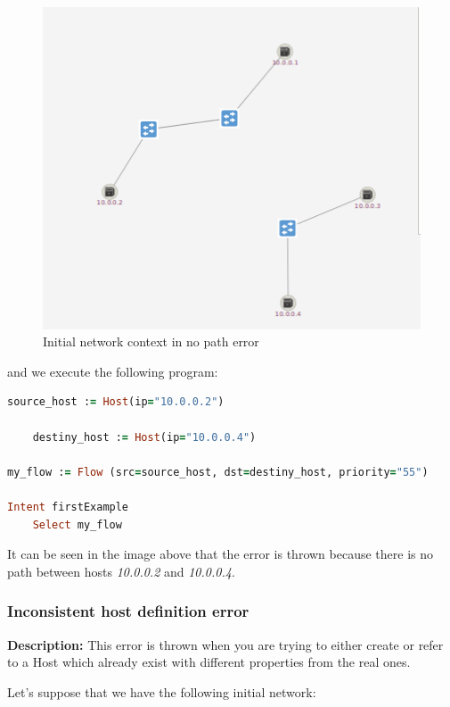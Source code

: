 \begin{figure}[H]
\centering
\includegraphics[width=\textwidth]{images/haikunet/error_scenario_2.png}
\caption{Initial network context in no path error}
\end{figure}

and we execute the following program:

\begin{lstlisting}[language=Ruby,breaklines=true]
source_host := Host(ip="10.0.0.2")

    destiny_host := Host(ip="10.0.0.4")

my_flow := Flow (src=source_host, dst=destiny_host, priority="55")

Intent firstExample
    Select my_flow
\end{lstlisting}

It can be seen in the image above that the error is thrown because there is no path between hosts \textit{10.0.0.2} and \textit{10.0.0.4}. 

\subsubsection{Inconsistent host definition error}

\textbf{Description:} This error is thrown when you are trying to either create or refer to a Host which already exist with different properties from the real ones. 

Let's suppose that we have the following initial network:


